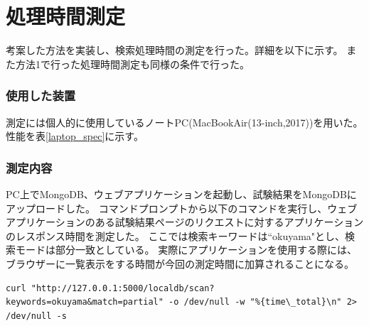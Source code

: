 
\clearpage
\section{処理時間測定} \label{sec:search_process_time_mes}

考案した方法を実装し、検索処理時間の測定を行った。詳細を以下に示す。
また方法1で行った処理時間測定も同様の条件で行った。

\subsubsection{使用した装置}

測定には個人的に使用しているノートPC(MacBookAir(13-inch,2017))を用いた。
性能を表\ref{laptop_spec}に示す。

\begin{table}[tbp]
\caption[測定に使用したノートPCの性能]{測定に使用したノートPC(MacBookAir(13-inch,2017))の性能。検索処理時間の測定に個人的に使用しているノートPCを使用した。}
\label{laptop_spec}
\end{table}

\subsubsection{測定内容}

PC上でMongoDB、ウェブアプリケーションを起動し、試験結果をMongoDBにアップロードした。
コマンドプロンプトから以下のコマンドを実行し、ウェブアプリケーションのある試験結果ページのリクエストに対するアプリケーションのレスポンス時間を測定した。
ここでは検索キーワードは``okuyama"とし、検索モードは部分一致としている。
実際にアプリケーションを使用する際には、ブラウザーに一覧表示をする時間が今回の測定時間に加算されることになる。

{ \small
\begin{lstlisting}
curl "http://127.0.0.1:5000/localdb/scan?keywords=okuyama&match=partial" -o /dev/null -w "%{time\_total}\n" 2> /dev/null -s
\end{lstlisting}
}

